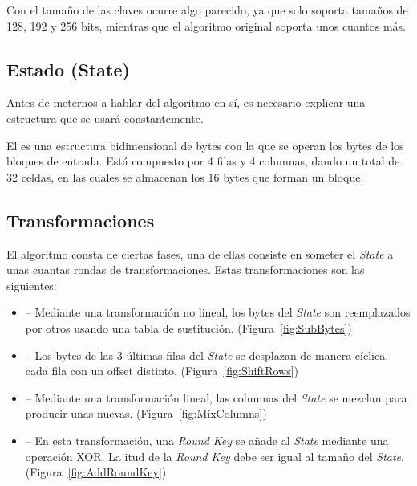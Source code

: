 Con el tamaño de las claves ocurre algo parecido, ya que  solo soporta tamaños de 128, 192 y 256 bits,
mientras que el algoritmo original soporta unos cuantos más. \emph{\parencite{Reference25}}

\subsection{Estado (State)}

Antes de meternos a hablar del algoritmo en sí, es necesario explicar una estructura que se usará
constantemente.

El  es una estructura bidimensional de bytes con la que se operan los bytes
de los bloques de entrada. Está compuesto por 4 filas y 4 columnas, dando un total de 32 celdas,
en las cuales se almacenan los 16 bytes que forman un bloque. \emph{\parencite{Reference26}}

\subsection{Transformaciones}

El algoritmo consta de ciertas fases, una de ellas consiste en someter el \emph{State}
a unas cuantas rondas de transformaciones. Estas transformaciones son las siguientes:

\begin{itemize}
  \item {} -- Mediante una transformación no lineal,
  los bytes del \emph{State} son reemplazados por otros usando una tabla de sustitución.
  (Figura~\ref{fig:SubBytes})

  \item {} -- Los bytes de las 3 últimas filas del \emph{State}
  se desplazan de manera cíclica, cada fila con un offset distinto.
  (Figura~\ref{fig:ShiftRows})

  \item {} -- Mediante una transformación lineal,
  las columnas del \emph{State} se mezclan para producir unas nuevas.
  (Figura~\ref{fig:MixColumns})

  \item {} -- En esta transformación, una \emph{Round Key} se
  añade al \emph{State} mediante una operación XOR.
  La itud de la \emph{Round Key} debe ser igual al tamaño del \emph{State}.
  (Figura~\ref{fig:AddRoundKey})
\end{itemize}

